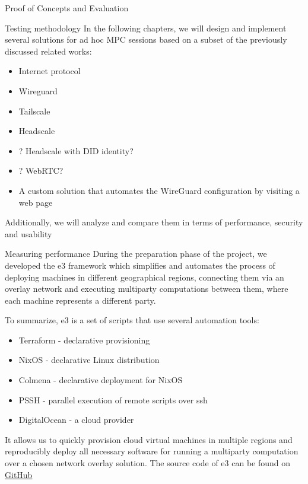\label{thesis__030-methods.md}
\begin{frame}{Proof of Concepts and Evaluation}
\label{thesis__030-methods.md__proof-of-concepts-and-evaluation}
\begin{block}{Testing methodology}
\label{thesis__030-methods.md__testing-methodology}
In the following chapters, we will design and implement several solutions for ad hoc MPC sessions based on a subset of the previously discussed related works:

\begin{itemize}
\tightlist
\item
  Internet protocol
\item
  Wireguard
\item
  Tailscale
\item
  Headscale
\item
  ? Headscale with DID identity?
\item
  ? WebRTC?
\item
  A custom solution that automates the WireGuard configuration by visiting a web page
\end{itemize}

Additionally, we will analyze and compare them in terms of performance, security and usability

\begin{block}{Measuring performance}
\label{thesis__030-methods.md__measuring-performance}
During the preparation phase of the project, we developed the \gls{e3} framework which simplifies and automates the process of deploying machines in different geographical regions, connecting them via an overlay network and executing multiparty computations between them, where each machine represents a different party.

To summarize, \gls{e3} is a set of scripts that use several automation tools:

\begin{itemize}
\tightlist
\item
  Terraform - declarative provisioning
\item
  NixOS - declarative Linux distribution
\item
  Colmena - declarative deployment for NixOS
\item
  PSSH - parallel execution of remote scripts over ssh
\item
  DigitalOcean - a cloud provider
\end{itemize}

It allows us to quickly provision cloud virtual machines in multiple regions and reproducibly deploy all necessary software for running a multiparty computation over a chosen network overlay solution. The source code of \gls{e3} can be found on \href{https://github.com/e-nikolov/mpyc}{GitHub}


\end{block}
\end{block}
\end{frame}

